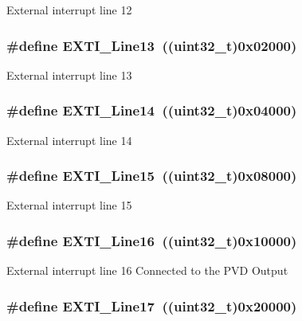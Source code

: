 \label{group__EXTI__Lines_gab73a0a31f1814118955099b9dd3bdfef}
External interrupt line 12 \hypertarget{group__EXTI__Lines_gae382388ac34b78917a7bd06562e35c42}{
\subsubsection[{EXTI\_\-Line13}]{\setlength{\rightskip}{0pt plus 5cm}\#define EXTI\_\-Line13~((uint32\_\-t)0x02000)}}
\label{group__EXTI__Lines_gae382388ac34b78917a7bd06562e35c42}
External interrupt line 13 \hypertarget{group__EXTI__Lines_ga7b3821ad1b7a00b49c27075688f48101}{
\subsubsection[{EXTI\_\-Line14}]{\setlength{\rightskip}{0pt plus 5cm}\#define EXTI\_\-Line14~((uint32\_\-t)0x04000)}}
\label{group__EXTI__Lines_ga7b3821ad1b7a00b49c27075688f48101}
External interrupt line 14 \hypertarget{group__EXTI__Lines_gafc5ea85d1fc095a855fde8977a338c4c}{
\subsubsection[{EXTI\_\-Line15}]{\setlength{\rightskip}{0pt plus 5cm}\#define EXTI\_\-Line15~((uint32\_\-t)0x08000)}}
\label{group__EXTI__Lines_gafc5ea85d1fc095a855fde8977a338c4c}
External interrupt line 15 \hypertarget{group__EXTI__Lines_ga21326db7db8ca614c746b7f52dc45ead}{
\subsubsection[{EXTI\_\-Line16}]{\setlength{\rightskip}{0pt plus 5cm}\#define EXTI\_\-Line16~((uint32\_\-t)0x10000)}}
\label{group__EXTI__Lines_ga21326db7db8ca614c746b7f52dc45ead}
External interrupt line 16 Connected to the PVD Output \hypertarget{group__EXTI__Lines_ga3e0fc18bc0722adc09605e3093b24c6a}{
\subsubsection[{EXTI\_\-Line17}]{\setlength{\rightskip}{0pt plus 5cm}\#define EXTI\_\-Line17~((uint32\_\-t)0x20000)}}
